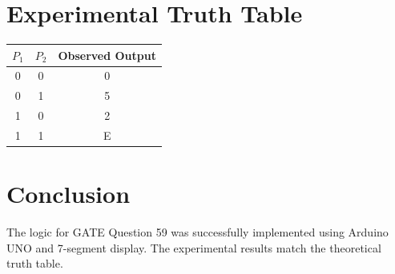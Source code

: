 \documentclass{article}
\begin{document}
\section*{Experimental Truth Table}

\begin{center}
\begin{tabular}{|c|c|c|}
\hline
$P_1$ & $P_2$ & Observed Output \\
\hline
0 & 0 & 0 \\
0 & 1 & 5 \\
1 & 0 & 2 \\
1 & 1 & E \\
\hline
\end{tabular}
\end{center}

\section*{Conclusion}

The logic for GATE Question 59 was successfully implemented using Arduino UNO and 7-segment display.  
The experimental results match the theoretical truth table.
\end{document}
